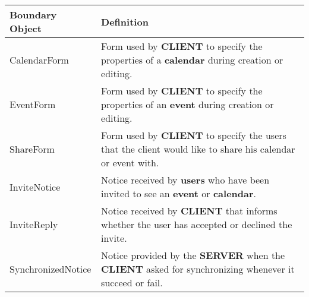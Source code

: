 \newpage

\begin{tabular}{|l|p{10cm}|}
\hline
\textbf{Boundary Object} & \textbf{Definition} \\ \hline
CalendarForm & Form used by \textbf{CLIENT} to specify the properties of a \textbf{calendar} during creation or editing. \\ \hline
EventForm & Form used by \textbf{CLIENT} to specify the properties of an \textbf{event} during creation or editing. \\ \hline
ShareForm & Form used by \textbf{CLIENT} to specify the users that the client would like to share his calendar or event with. \\ \hline
InviteNotice & Notice received by \textbf{users} who have been invited to see an \textbf{event} or \textbf{calendar}. \\ \hline
InviteReply & Notice received by \textbf{CLIENT} that informs whether the user has accepted or declined the invite.   \\ \hline
SynchronizedNotice & Notice provided by the \textbf{SERVER} when the \textbf{CLIENT} asked for synchronizing whenever it succeed or fail.  \\ \hline
\end{tabular}